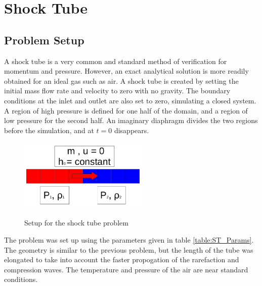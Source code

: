 \vspace*{-80mm}
\chapter{Shock Tube} \label{chapter7:Shock_Tube}
 
	\section{Problem Setup} \label{Verification:Shock_Tube}
        
    A shock tube is a very common and standard method of verification for
    momentum and pressure. However, an exact analytical solution is more readily
    obtained for an ideal gas such as air. A shock tube is created by setting
    the initial mass flow rate and velocity to zero with no gravity. The
    boundary conditions at the inlet and outlet are also set to zero, simulating
    a closed system. A region of high pressure is defined for one half of the
    domain, and a region of low pressure for the second half. An imaginary
    diaphragm divides the two regions before the simulation, and at $t=0$
    disappears.
    
    \begin{figure}[!h]
    	\centering
    	\includegraphics[width=0.55\textwidth]{images/Verification_Problem2_shock_tube}
    	\label{fig:Verification_2}
    	\caption{Setup for the shock tube problem}
    \end{figure}
    
    The problem was set up using the parameters given in table
    \ref{table:ST_Params}. The geometry is similar to the previous problem, but
    the length of the tube was elongated to take into account the faster
    propogation of the rarefaction and compression waves. The temperature and
    pressure of the air are near standard conditions.
    

